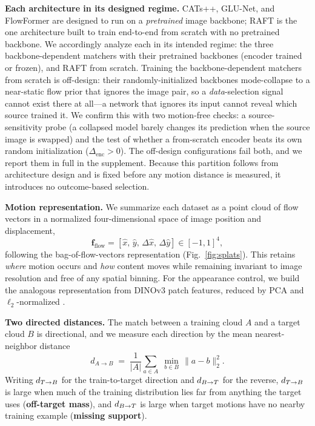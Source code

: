 \noindent\textbf{Each architecture in its designed regime.} CATs++, GLU-Net, and
FlowFormer are designed to run on a \emph{pretrained} image backbone; RAFT is the
one architecture built to train end-to-end from scratch with no pretrained
backbone. We accordingly analyze each in its intended regime: the three
backbone-dependent matchers with their pretrained backbones (encoder trained or
frozen), and RAFT from scratch. Training the backbone-dependent matchers from
scratch is off-design: their randomly-initialized backbones mode-collapse to a
near-static flow prior that ignores the image pair, so a \emph{data}-selection
signal cannot exist there at all---a network that ignores its input cannot reveal
which source trained it. We confirm this with two motion-free checks: a
source-sensitivity probe (a collapsed model barely changes its prediction when the
source image is swapped) and the test of whether a from-scratch encoder beats its
own random initialization ($\Delta_{\text{enc}}{>}0$). The off-design
configurations fail both, and we report them in full in the supplement. Because
this partition follows from architecture design and is fixed before any motion
distance is measured, it introduces no outcome-based selection.

\noindent\textbf{Motion representation.}
We summarize each dataset as a point cloud of flow vectors in a normalized
four-dimensional space of image position and displacement,
\begin{equation}
\mathbf{f}_{\text{flow}} = [\hat{x},\, \hat{y},\, \Delta\hat{x},\,
\Delta\hat{y}] \in [-1,1]^4,
\label{eq:bfv}
\end{equation}
following the bag-of-flow-vectors representation (Fig.~\ref{fig:splats}). This
retains \emph{where} motion occurs and \emph{how} content moves while remaining
invariant to image resolution and free of any spatial binning. For the
appearance control, we build the analogous representation from DINOv3 patch
features, reduced by PCA and $\ell_2$-normalized \cite{simeoni2025dinov3}.

\noindent\textbf{Two directed distances.}
The match between a training cloud $A$ and a target cloud $B$ is directional,
and we measure each direction by the mean nearest-neighbor distance
\begin{equation}
d_{A \to B} \;=\; \frac{1}{|A|}\sum_{a \in A}\; \min_{b \in B}\,
\lVert a - b \rVert_2^2 .
\label{eq:dirdist}
\end{equation}
Writing $d_{T\to B}$ for the train-to-target direction and $d_{B\to T}$ for the reverse,
$d_{T\to B}$ is large when much of the training distribution lies far from anything
the target uses (\textbf{off-target mass}), and $d_{B\to T}$ is large when target
motions have no nearby training example (\textbf{missing support}).


